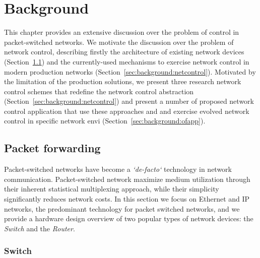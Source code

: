 \chapter{Background} \label{ch:background}
\ifpdf
    \graphicspath{{Background/BackgroundFigs/PNG/}{Chapter3/BackgroundFigs/PDF/}{Background/BackgroundFigs/}}
\else
    \graphicspath{{Background/BackgroundFigs/EPS/}{Background/BackgroundFigs/}}
\fi

This chapter provides an extensive discussion over the problem of control in
packet-switched networks. We motivate the discussion over the problem of network 
control, describing firstly the architecture of existing network devices
(Section~\ref{sec:background:forwarding}) and  the currently-used mechanisms to
exercise network control in modern production networks
(Section~\ref{sec:background:netcontrol}). Motivated by the limitation of the
production solutions, we present three research network control schemes that
redefine the network control abstraction
(Section~\ref{sec:background:netcontrol}) and present
a number of proposed network control application that use these approaches and
and exercise evolved network control in specific network envi (Section~\ref{sec:background:ofapp}).

\section{Packet forwarding} \label{sec:background:forwarding}

Packet-switched networks have become a \emph{`de-facto`} technology in network
communication. Packet-switched network maximize medium utilization through their
inherent statistical multiplexing approach, while their simplicity significantly
reduces network costs.  In this section we focus on Ethernet and IP networks,
the predominant technology for packet switched networks, and we provide a
hardware design overview of two popular types of network devices: the {\it
  Switch } and the {\it Router}. 

\subsection{Switch}

